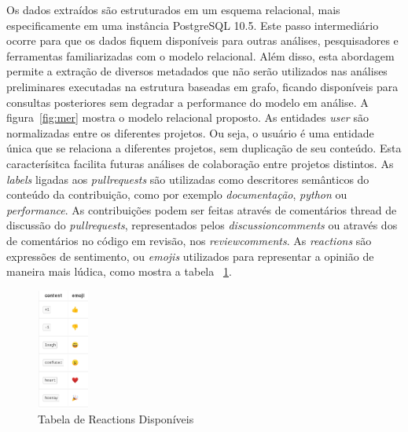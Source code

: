 \documentclass[a4paper,12pt]{monografia}
\theoremstyle{plain}
\theoremstyle{definition}
\theoremstyle{remark}
\begin{document}
Os dados extraídos são estruturados em um esquema relacional, mais especificamente em uma instância PostgreSQL 10.5. Este passo intermediário ocorre para que os dados fiquem disponíveis para outras análises, pesquisadores e ferramentas familiarizadas com o modelo relacional. Além disso, esta abordagem permite a extração de diversos metadados que não serão utilizados nas análises preliminares executadas na estrutura baseadas em grafo, ficando disponíveis para consultas posteriores sem degradar a performance do modelo em análise. A figura~\ref{fig:mer} mostra o modelo relacional proposto. As entidades \textit{user} são normalizadas entre os diferentes projetos. Ou seja, o usuário é uma entidade única que se relaciona a diferentes projetos, sem duplicação de seu conteúdo. Esta caracterísitca facilita futuras análises de colaboração entre projetos distintos. As \textit{labels} ligadas aos \textit{pullrequests} são utilizadas como descritores semânticos do conteúdo da contribuição, como por exemplo \textit{documentação}, \textit{python} ou \textit{performance}. As contribuições podem ser feitas através de comentários thread de discussão do \textit{pullrequests}, representados pelos \textit{discussioncomments} ou através dos de comentários no código em revisão, nos \textit{reviewcomments}. As \textit{reactions} são expressões de sentimento, ou \textit{emojis} utilizados para representar a opinião de maneira mais lúdica, como mostra a tabela ~\ref{fig:reactions}.

\begin{figure}[!htbp]
 \centering
 \includegraphics[height=150]{reactions}
 \caption{Tabela de Reactions Disponíveis}\label{fig:reactions}
\end{figure}
\end{document}
